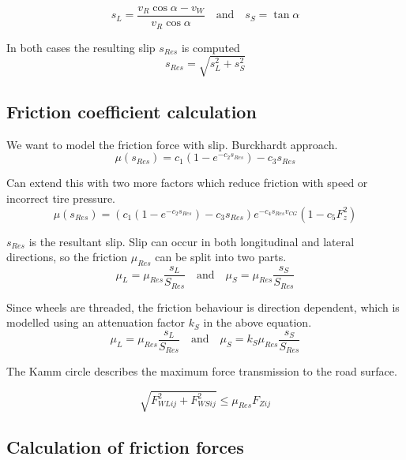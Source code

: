 \begin{equation}
  s_L = \frac{v_R \cos{\alpha} - v_W}{v_R \cos{\alpha}}
  \quad \text{and} \quad
  s_S = \tan{\alpha}
\end{equation}

In both cases the resulting slip $s_{Res}$ is computed 
\begin{equation}
  s_{Res} = \sqrt{s_L^2 + s_S^2}
\end{equation}


\subsection{Friction coefficient calculation}

We want to model the friction force with slip. 
Burckhardt approach.
\begin{equation}
    \mu(s_{Res}) = c_1 \left( 1 - e^{-c_2 s_{Res}} \right) - c_3 s_{Res}
\end{equation}

Can extend this with two more factors which reduce friction with speed or incorrect tire pressure.
\begin{equation}
  \mu(s_{Res}) = \left( c_1 \left( 1 - e^{-c_2 s_{Res}} \right) - c_3 s_{Res} \right) e^{-c_4 s_{Res} v_{CG}} (1 - c_5 F_z^2)
\end{equation}

$s_{Res}$ is the resultant slip. Slip can occur in both longitudinal and lateral directions, so the friction $\mu_{Res}$ can be split into two parts.
\begin{equation}
  \mu_L = \mu_{Res}\frac{s_L}{S_{Res}} 
  \quad \text{and} \quad
  \mu_S = \mu_{Res}\frac{s_S}{S_{Res}} 
\end{equation}

Since wheels are threaded, the friction behaviour is direction dependent, which is modelled using an attenuation factor $k_S$ in the above equation.
\begin{equation}
  \mu_L = \mu_{Res}\frac{s_L}{S_{Res}} 
  \quad \text{and} \quad
  \mu_S = k_S \mu_{Res} \frac{s_S}{S_{Res}} 
\end{equation}

The Kamm circle describes the maximum force transmission to the road surface.

\begin{equation}
  \sqrt{F_{WLij}^2 + F_{WSij}^2} \leq \mu_{Res} F_{Zij}
\end{equation}


\subsection{Calculation of friction forces}

